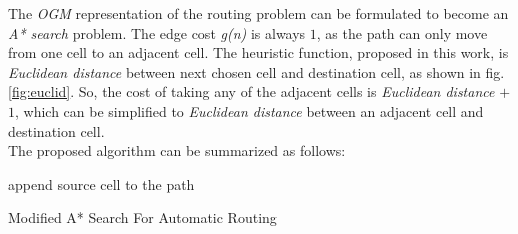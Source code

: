 The \emph{OGM} representation of the routing problem can be formulated to become an \emph{A* search} problem. The edge cost \emph{g(n)} is always $1$, as the path can only move from one cell to an adjacent cell. The heuristic function, proposed in this work, is \emph{Euclidean distance} between next chosen cell and destination cell, as shown in  fig.\ref{fig:euclid}. So, the cost of taking any of the adjacent cells is \emph{Euclidean distance} $+$ $1$, which can be simplified to \emph{Euclidean distance} between an adjacent cell and destination cell.\\

The proposed algorithm can be summarized as follows:

\begin{algorithm}[]
\SetAlgoLined
{}
 append source cell to the path\;
 \caption{Modified A* Search For Automatic Routing}
\end{algorithm}

